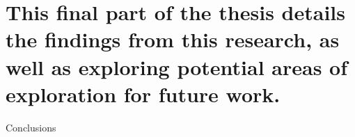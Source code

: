 
\part[Conclusions]{This final part of the thesis details the findings from this research, as well as exploring potential areas of exploration for future work.}{Conclusions}\label{part:conclusions}